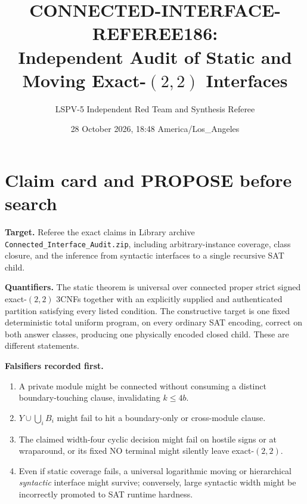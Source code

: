 \documentclass[11pt]{article}
\title{CONNECTED-INTERFACE-REFEREE186:\\Independent Audit of Static and Moving Exact-$(2,2)$ Interfaces}
\author{LSPV-5 Independent Red Team and Synthesis Referee}
\date{28 October 2026, 18:48 America/Los\_Angeles}
\begin{document}
\maketitle

\begin{center}
\end{center}

\section{Claim card and PROPOSE before search}
\textbf{Target.} Referee the exact claims in Library archive
\texttt{Connected\_Interface\_Audit.zip}, including arbitrary-instance
coverage, class closure, and the inference from syntactic interfaces to a
single recursive SAT child.

\textbf{Quantifiers.}  The static theorem is universal over connected proper
strict signed exact-$(2,2)$ 3CNFs together with an explicitly supplied and
authenticated partition satisfying every listed condition.  The constructive
target is one fixed deterministic total uniform program, on every ordinary
SAT encoding, correct on both answer classes, producing one physically encoded
closed child.  These are different statements.

\textbf{Falsifiers recorded first.}
\begin{enumerate}
\item A private module might be connected without consuming a distinct
boundary-touching clause, invalidating $k\le4b$.
\item $Y\cup\bigcup_iB_i$ might fail to hit a boundary-only or cross-module
clause.
\item The claimed width-four cyclic decision might fail on hostile signs or
at wraparound, or its fixed NO terminal might silently leave exact-$(2,2)$.
\item Even if static coverage fails, a universal logarithmic moving or
hierarchical \emph{syntactic} interface might survive; conversely, large
syntactic width might be incorrectly promoted to SAT runtime hardness.
\end{enumerate}
\end{document}
